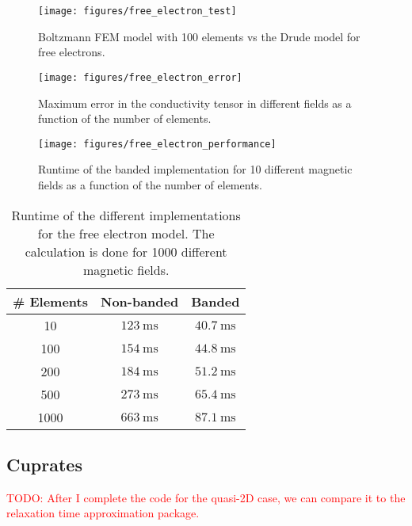 \documentclass[12pt]{article}
\begin{document}
\begin{figure}
    \centering
    \texttt{[image: figures/free\_electron\_test]}
    \caption{Boltzmann FEM model with 100 elements vs the Drude model for free electrons.}
    \label{fig:test}
\end{figure}

\begin{figure}
    \centering
    \texttt{[image: figures/free\_electron\_error]}
    \caption{Maximum error in the conductivity tensor in different fields as a function of the
        number of elements.}
    \label{fig:error}
\end{figure}

\begin{figure}
    \centering
    \texttt{[image: figures/free\_electron\_performance]}
    \caption{Runtime of the banded implementation for 10 different magnetic fields as a function
        of the number of elements.}
    \label{fig:performance}
\end{figure}

\begin{table}
    \centering
    \begin{tabular}{|c|c|c|}
        \hline
        \# Elements & Non-banded & Banded \\
        \hline
        10 & $\SI{123}{\milli\second}$ & $\SI{40.7}{\milli\second}$ \\
        100 & $\SI{154}{\milli\second}$ & $\SI{44.8}{\milli\second}$ \\
        200 & $\SI{184}{\milli\second}$ & $\SI{51.2}{\milli\second}$ \\
        500 & $\SI{273}{\milli\second}$ & $\SI{65.4}{\milli\second}$ \\
        1000 & $\SI{663}{\milli\second}$ & $\SI{87.1}{\milli\second}$ \\
        \hline
    \end{tabular}
    \caption{Runtime of the different implementations for the free electron model.
        The calculation is done for 1000 different magnetic fields.}
    \label{tab:performance}
\end{table}

\subsection{Cuprates}
\textcolor{red}{TODO: After I complete the code for the quasi-2D case, we can compare it to the
    relaxation time approximation package.}
\end{document}

